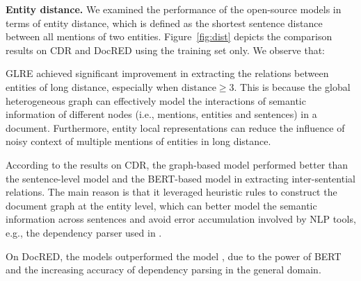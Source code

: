 \documentclass[11pt,a4paper]{article}
\begin{document}
\noindent\textbf{Entity distance.} We examined the performance of the open-source models in terms of entity distance, which is defined as the shortest sentence distance between all mentions of two entities. Figure~\ref{fig:dist} depicts the comparison results on CDR and DocRED using the training set only. We observe that:
\begin{compactenum}[(1)]
\item GLRE achieved significant improvement in extracting the relations between entities of long distance, especially when $\textrm{distance}\geq 3$. This is because the global heterogeneous graph can effectively model the interactions of semantic information of different nodes (i.e., mentions, entities and sentences) in a document. Furthermore, entity local representations can reduce the influence of noisy context of multiple mentions of entities in long distance.

\item According to the results on CDR, the graph-based model \cite{christopoulou2019connecting} performed better than the sentence-level model \cite{zhang2018graph} and the BERT-based model \cite{wang2019fine} in extracting inter-sentential relations. The main reason is that it leveraged heuristic rules to construct the document graph at the entity level, which can better model the semantic information across sentences and avoid error accumulation involved by NLP tools, e.g., the dependency parser used in \citet{zhang2018graph}.

\item On DocRED, the models \cite{wang2019fine,zhang2018graph} outperformed the model \cite{christopoulou2019connecting}, due to the power of BERT and the increasing accuracy of dependency parsing in the general domain.
\end{compactenum}
\end{document}
